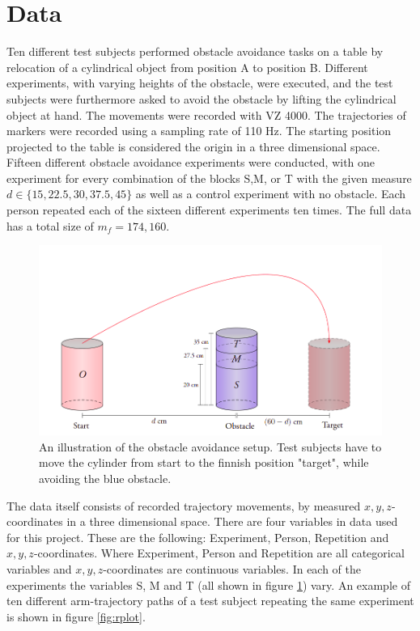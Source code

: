\documentclass[11pt, fleqn, titlepage]{article}
\begin{document}
\section{Data}
Ten different test subjects performed obstacle avoidance tasks on a table by relocation of a cylindrical object from position A to position B. Different experiments, with varying heights of the obstacle, were executed, and the test subjects were furthermore asked to avoid the obstacle by lifting the cylindrical object at hand. The movements were recorded with VZ 4000. The trajectories of markers were recorded using a sampling rate of 110 Hz. The starting position projected to the table is considered the origin in a three dimensional space. Fifteen different obstacle avoidance experiments were conducted, with one experiment for every combination of the blocks S,M, or T with the given measure $ d \in \{15, 22.5,  30, 37.5, 45\} $ as well as a control experiment with no obstacle. Each person repeated each of the sixteen different experiments ten times. The full data has a total size of $ m_f = 174,160 $. \cite{armdata}
\begin{figure}[H]
	\centering
	\includegraphics[width=0.5\linewidth]{billeder/exp_pic.png}
	\caption{An illustration of the obstacle avoidance setup. Test subjects have to move the cylinder from start to the finnish position "target", while avoiding the blue obstacle.}
	\label{fig:exppic}
\end{figure} \noindent
The data itself consists of recorded trajectory movements, by measured $ x,y,z $-coordinates in a three dimensional space. There are four variables in data used for this project. These are the following: Experiment, Person, Repetition and $ x,y,z $-coordinates. Where Experiment, Person and Repetition are all categorical variables and $ x,y,z $-coordinates are continuous variables. In each of the experiments the variables S, M and T (all shown in figure \ref{fig:exppic}) vary. An example of ten different arm-trajectory paths of a test subject repeating the same experiment is shown in figure \ref{fig:rplot}.
\end{document}

